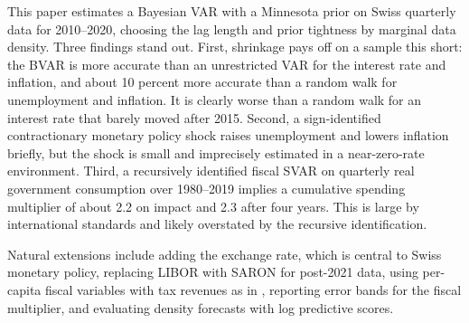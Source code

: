 \documentclass[11pt]{article}
\begin{document}
This paper estimates a Bayesian VAR with a Minnesota prior on Swiss quarterly data for 2010--2020, choosing the lag length and prior tightness by marginal data density. Three findings stand out. First, shrinkage pays off on a sample this short: the BVAR is more accurate than an unrestricted VAR for the interest rate and inflation, and about 10 percent more accurate than a random walk for unemployment and inflation. It is clearly worse than a random walk for an interest rate that barely moved after 2015. Second, a sign-identified contractionary monetary policy shock raises unemployment and lowers inflation briefly, but the shock is small and imprecisely estimated in a near-zero-rate environment. Third, a recursively identified fiscal SVAR on quarterly real government consumption over 1980--2019 implies a cumulative spending multiplier of about 2.2 on impact and 2.3 after four years. This is large by international standards and likely overstated by the recursive identification.

Natural extensions include adding the exchange rate, which is central to Swiss monetary policy, replacing LIBOR with SARON for post-2021 data, using per-capita fiscal variables with tax revenues as in \citet{blanchardperotti2002}, reporting error bands for the fiscal multiplier, and evaluating density forecasts with log predictive scores.
\end{document}
